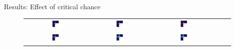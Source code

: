 \documentclass[10pt,xcolor=dvipsnames,compress]{beamer}
\begin{document}
\begin{frame}{Results: Effect of critical chance}
\centering
    \begin{figure}
        \centering
        \footnotesize
        \begin{tabular}{c c c c}
        \includegraphics[trim={3.6in 1.8in 3.5in 2.5in},clip,width=0.2\textwidth]{Figures/CC1.png}&
        \includegraphics[trim={3.6in 1.8in 3.5in 2.5in},clip,width=0.2\textwidth]{Figures/CC2.png}&
        \includegraphics[trim={3.6in 1.8in 3.5in 2.5in},clip,width=0.2\textwidth]{Figures/CC3.png}&
        \includegraphics[width=0.06\textwidth]{Figures/design_contour.png}\\
        \includegraphics[trim={3.6in 1.8in 3.5in 2.5in},clip,width=0.2\textwidth]{Figures/Stress_CC1.png}&
        \includegraphics[trim={3.6in 1.8in 3.5in 2.5in},clip,width=0.2\textwidth]{Figures/Stress_CC2.png}&
        \includegraphics[trim={3.6in 1.8in 3.5in 2.5in},clip,width=0.2\textwidth]{Figures/Stress_CC3.png}&

\end{tabular}
\end{figure}
\end{frame}
\end{document}
